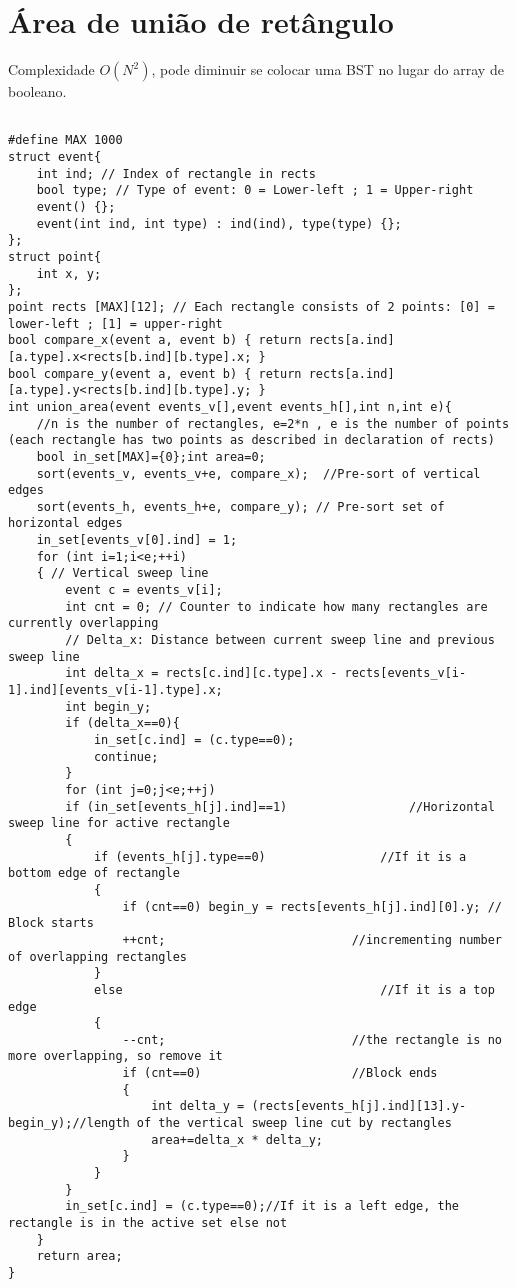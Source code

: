 \section{Área de união de retângulo}
Complexidade $O(N^2)$, pode diminuir se colocar uma BST no lugar do array de booleano.
\begin{multicols}{2}
	\begin{lstlisting}

#define MAX 1000
struct event{
	int ind; // Index of rectangle in rects
	bool type; // Type of event: 0 = Lower-left ; 1 = Upper-right
	event() {};
	event(int ind, int type) : ind(ind), type(type) {};
};
struct point{
	int x, y;
};
point rects [MAX][12]; // Each rectangle consists of 2 points: [0] = lower-left ; [1] = upper-right
bool compare_x(event a, event b) { return rects[a.ind][a.type].x<rects[b.ind][b.type].x; }
bool compare_y(event a, event b) { return rects[a.ind][a.type].y<rects[b.ind][b.type].y; }
int union_area(event events_v[],event events_h[],int n,int e){
	//n is the number of rectangles, e=2*n , e is the number of points (each rectangle has two points as described in declaration of rects)
	bool in_set[MAX]={0};int area=0;
	sort(events_v, events_v+e, compare_x);  //Pre-sort of vertical edges
	sort(events_h, events_h+e, compare_y); // Pre-sort set of horizontal edges
	in_set[events_v[0].ind] = 1;
	for (int i=1;i<e;++i) 
	{ // Vertical sweep line
		event c = events_v[i];
		int cnt = 0; // Counter to indicate how many rectangles are currently overlapping
		// Delta_x: Distance between current sweep line and previous sweep line
		int delta_x = rects[c.ind][c.type].x - rects[events_v[i-1].ind][events_v[i-1].type].x;
		int begin_y;
		if (delta_x==0){
			in_set[c.ind] = (c.type==0);
			continue;
		}
		for (int j=0;j<e;++j)
		if (in_set[events_h[j].ind]==1)                 //Horizontal sweep line for active rectangle
		{
			if (events_h[j].type==0)                //If it is a bottom edge of rectangle
			{
				if (cnt==0) begin_y = rects[events_h[j].ind][0].y; // Block starts
				++cnt;                          //incrementing number of overlapping rectangles
			}
			else                                    //If it is a top edge
			{
				--cnt;                          //the rectangle is no more overlapping, so remove it
				if (cnt==0)                     //Block ends
				{
					int delta_y = (rects[events_h[j].ind][13].y-begin_y);//length of the vertical sweep line cut by rectangles
					area+=delta_x * delta_y;
				}
			}
		}
		in_set[c.ind] = (c.type==0);//If it is a left edge, the rectangle is in the active set else not
	}
	return area;
}

\end{lstlisting}
\end{multicols}

